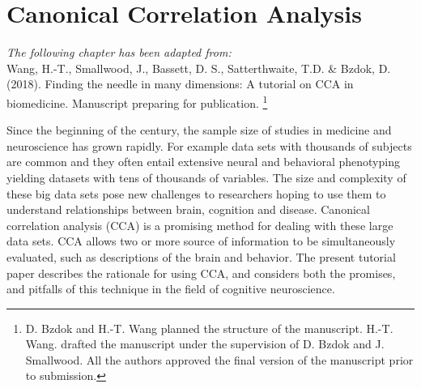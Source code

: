 \chapter{Canonical Correlation Analysis}
\label{ch:methods}


\textit{The following chapter has been adapted from:\\}
Wang, H.-T., Smallwood, J., Bassett, D. S., Satterthwaite, T.D. \& Bzdok, D. (2018). Finding the needle in many dimensions: A tutorial on CCA in biomedicine. Manuscript preparing for publication.
\footnote{
D. Bzdok and H.-T. Wang planned the structure of the manuscript.  H.-T. Wang. drafted the manuscript under the supervision of D. Bzdok and J. Smallwood. All the authors approved the final version of the manuscript prior to submission.}\\
\newpage

\noindent{}Since the beginning of the  century, the sample size of studies in medicine and neuroscience has grown rapidly. For example data sets with thousands of subjects are common and they often entail extensive neural and behavioral phenotyping yielding datasets with tens of thousands of variables. The size and complexity of these big data sets pose new challenges to researchers hoping to use them to understand relationships between brain, cognition and disease. Canonical correlation analysis (CCA) is a promising method for dealing with these large data sets. CCA allows two or more source of information to be simultaneously evaluated, such as descriptions of the brain and behavior. The present tutorial paper describes the rationale for using CCA, and considers both the promises, and pitfalls of this technique in the field of cognitive neuroscience.



